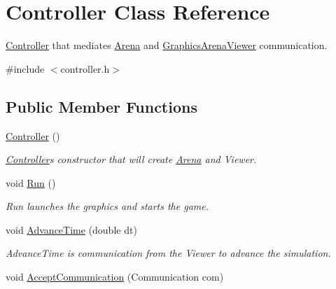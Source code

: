 \hypertarget{class_controller}{}\section{Controller Class Reference}
\label{class_controller}


\hyperlink{class_controller}{Controller} that mediates \hyperlink{class_arena}{Arena} and \hyperlink{class_graphics_arena_viewer}{Graphics\+Arena\+Viewer} communication.  




{\ttfamily \#include $<$controller.\+h$>$}

\subsection*{Public Member Functions}
\begin{DoxyCompactItemize}
\item 
\hyperlink{class_controller_a95c56822d667e94b031451729ce069a9}{Controller} ()\hypertarget{class_controller_a95c56822d667e94b031451729ce069a9}{}\label{class_controller_a95c56822d667e94b031451729ce069a9}

\begin{DoxyCompactList}\small\item\em \hyperlink{class_controller}{Controller}\textquotesingle{}s constructor that will create \hyperlink{class_arena}{Arena} and Viewer. \end{DoxyCompactList}\item 
void \hyperlink{class_controller_a17abb2cec6c0109e9b2df3cdc082eaad}{Run} ()\hypertarget{class_controller_a17abb2cec6c0109e9b2df3cdc082eaad}{}\label{class_controller_a17abb2cec6c0109e9b2df3cdc082eaad}

\begin{DoxyCompactList}\small\item\em Run launches the graphics and starts the game. \end{DoxyCompactList}\item 
void \hyperlink{class_controller_a6a4a3eaee03f6c4718da3f8293d7e053}{Advance\+Time} (double dt)\hypertarget{class_controller_a6a4a3eaee03f6c4718da3f8293d7e053}{}\label{class_controller_a6a4a3eaee03f6c4718da3f8293d7e053}

\begin{DoxyCompactList}\small\item\em Advance\+Time is communication from the Viewer to advance the simulation. \end{DoxyCompactList}\item 
void \hyperlink{class_controller_a55b8d46984535adb91f40309914e8852}{Accept\+Communication} (Communication com)\hypertarget{class_controller_a55b8d46984535adb91f40309914e8852}{}\label{class_controller_a55b8d46984535adb91f40309914e8852}


\end{DoxyCompactItemize}
